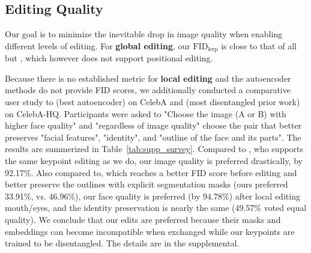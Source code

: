 \documentclass[10pt, conference, compsocconf]{IEEEtran}
\begin{document}
\subsection{Editing Quality}
\label{sec:image_quality}
Our goal is to minimize the inevitable drop in image quality when enabling different levels of editing. 
For \textbf{global editing}, our $\text{FID}_\text{lerp}$ is close to that of all but \cite{kim2021exploiting}, which however does not support positional editing.

 Because there is no established metric for \textbf{local editing} and the autoencoder methods do not provide FID scores, we additionally conducted a comparative user study to  \cite{zhang2018unsupervised} (best autoencoder) on CelebA and \cite{zhu2020sean} (most disentangled prior work) on CelebA-HQ. Participants were asked to "Choose the image (A or B) with higher face quality" and "regardless of image quality" choose the pair that better preserves "facial features", "identity", and "outline of the face and its parts". The results are summerized in Table~\ref{tab:supp_survey}.
Compared to \cite{zhang2018unsupervised}, who supports the same keypoint editing as we do, our image quality is preferred drastically, by 92.17\%.
Also compared to, \cite{zhu2020sean} which reaches a better FID score before editing and better preserve the outlines with explicit segmentation masks (ours preferred 33.91\%, vs. 46.96\%), our face quality is preferred (by 94.78\%) after local editing mouth/eyes, and the identity preservation is nearly the same (49.57\% voted equal quality). We conclude that our edits are preferred because their masks and embeddings can become incompatible when exchanged while our keypoints are trained to be disentangled. 
The details are in the supplemental. 

\begin{table}
\begin{center}
\end{center}
\caption{\textbf{Survey results}.
}
\label{tab:supp_survey}
\end{table}
\end{document}
